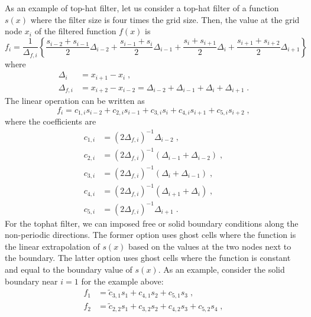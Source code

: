 As an example of top-hat filter, let us consider a top-hat filter of a function $s(x)$ where the filter size is four times the grid size. Then, the value at the grid node $x_i$ of the filtered function $f(x)$ is
\begin{equation}
  f_i = \frac{1}{\Delta_{f,i}}\left\{\frac{s_{i-2}+s_{i-1}}{2}\Delta_{i-2}+
  \frac{s_{i-1}+s_{i}}{2}\Delta_{i-1}+\frac{s_{i}+s_{i+1}}{2}\Delta_{i}+
  \frac{s_{i+1}+s_{i+2}}{2}\Delta_{i+1}\right\}
\end{equation}
where
\begin{subequations}
  \begin{align}
    \Delta_i&=x_{i+1}-x_{i} \;,\\
    \Delta_{f,i}&=x_{i+2}-x_{i-2}=\Delta_{i-2}+\Delta_{i-1}+\Delta_{i}+\Delta_{i+1} \;.
  \end{align}
\end{subequations}
The linear operation can be written as
\begin{equation}
  f_i = c_{1,i}s_{i-2}+c_{2,i}s_{i-1}+c_{3,i}s_{i}+c_{4,i}s_{i+1}+c_{5,i}s_{i+2} \;,
\end{equation}
where the coefficients are
\begin{subequations}
  \begin{align}
    c_{1,i} &= (2\Delta_{f,i})^{-1} \Delta_{i-2}\;,\\
    c_{2,i} &= (2\Delta_{f,i})^{-1}(\Delta_{i-1}+\Delta_{i-2})\;,\\
    c_{3,i} &= (2\Delta_{f,i})^{-1}(\Delta_{i}+\Delta_{i-1})\;,\\
    c_{4,i} &= (2\Delta_{f,i})^{-1}(\Delta_{i+1}+\Delta_{i})\;,\\
    c_{5,i} &= (2\Delta_{f,i})^{-1}\Delta_{i+1}\;.
    \end{align}
\end{subequations}
For the tophat filter, we can imposed free or solid boundary conditions along the non-periodic directions. The former option uses ghost cells where the function is the linear extrapolation of $s(x)$ based on the values at the two nodes next to the boundary. The latter option uses ghost cells where the function is constant and equal to the boundary value of $s(x)$. As an example, consider the solid boundary near $i=1$ for the example above:
\begin{subequations}
  \begin{align}
    f_1 &= \tilde{c}_{3,1}s_{1}+c_{4,1}s_{2}+c_{5,1}s_{3} \;,\\
    f_2 &= \tilde{c}_{2,2}s_{1}+c_{3,2}s_{2}+c_{4,2}s_{3}+c_{5,2}s_{4} \;,
  \end{align}
\end{subequations}
